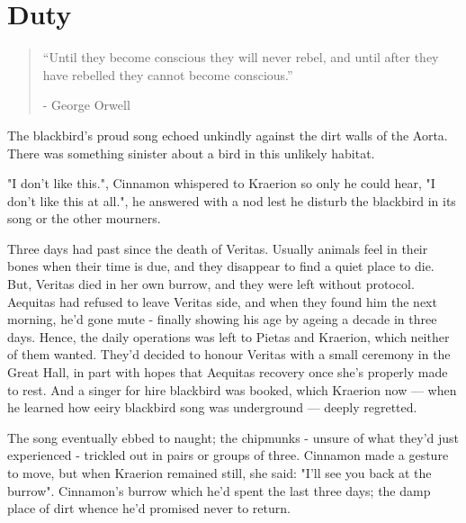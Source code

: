\chapter{Duty}

\vspace{-1.3cm}
\begin{localsize}{10}
	\begin{quote}
        “Until they become conscious they will never rebel, and until after they have rebelled they cannot become conscious.”
		\begin{flushright}- George Orwell \end{flushright}
	\end{quote} 
\end{localsize}
\vspace{1cm}

The blackbird's proud song echoed unkindly against the dirt walls of the Aorta. There was something sinister about a bird in this unlikely habitat.



"I don't like this.", Cinnamon whispered to Kraerion so only he could hear, "I don't like this at all.", he answered with a nod lest he disturb the blackbird in its song or the other mourners.

Three days had past since the death of Veritas. Usually animals feel in their bones when their time is due, and they disappear to find a quiet place to die. But, Veritas died in her own burrow, and they were left without protocol. Aequitas had refused to leave Veritas side, and when they found him the next morning, he'd gone mute - finally showing his age by ageing a decade in three days. Hence, the daily operations was left to Pietas and Kraerion, which neither of them wanted. They'd decided to honour Veritas with a small ceremony in the Great Hall, in part with hopes that Aequitas recovery once she's properly made to rest. And a singer for hire blackbird was booked, which Kraerion now — when he learned how eeiry blackbird song was underground — deeply regretted.

The song eventually ebbed to naught; the chipmunks - unsure of what they'd just experienced - trickled out in pairs or groups of three. Cinnamon made a gesture to move, but when Kraerion remained still, she said: "I'll see you back at the burrow". Cinnamon's burrow which he'd spent the last three days; the damp place of dirt whence he'd promised never to return.


